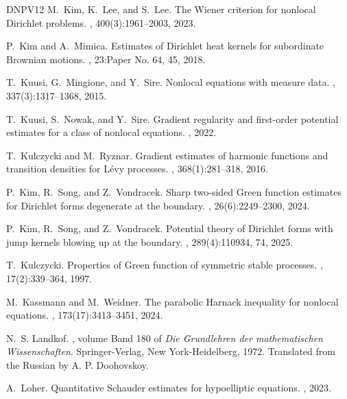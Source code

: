 \documentclass[11pt,reqno]{amsart}
\theoremstyle{plain}
\theoremstyle{definition}
\numberwithin{equation}{section}
\newcommand{\1}{\mathbbm{1}}
\begin{document}
\begin{thebibliography}{DNPV12}
M.~Kim, K.~Lee, and S.~Lee.
\newblock The {W}iener criterion for nonlocal {D}irichlet problems.
, 400(3):1961--2003, 2023.

P.~Kim and A.~Mimica.
\newblock Estimates of {D}irichlet heat kernels for subordinate {B}rownian
  motions.
, 23:Paper No. 64, 45, 2018.

T.~Kuusi, G.~Mingione, and Y.~Sire.
\newblock Nonlocal equations with measure data.
, 337(3):1317--1368, 2015.

T.~Kuusi, S.~Nowak, and Y.~Sire.
\newblock Gradient regularity and first-order potential estimates for a class
  of nonlocal equations.
, 2022.

T.~Kulczycki and M.~Ryznar.
\newblock Gradient estimates of harmonic functions and transition densities for
  {L}\'evy processes.
, 368(1):281--318, 2016.

P.~Kim, R.~Song, and Z.~Vondracek.
\newblock Sharp two-sided {G}reen function estimates for {D}irichlet forms
  degenerate at the boundary.
, 26(6):2249--2300, 2024.

P.~Kim, R.~Song, and Z.~Vondracek.
\newblock Potential theory of {D}irichlet forms with jump kernels blowing up at
  the boundary.
, 289(4):110934, 74, 2025.

T.~Kulczycki.
\newblock Properties of {G}reen function of symmetric stable processes.
, 17(2):339--364, 1997.

M.~Kassmann and M.~Weidner.
\newblock The parabolic {H}arnack inequality for nonlocal equations.
, 173(17):3413--3451, 2024.

N.~S. Landkof.
, volume Band 180 of {\em
  Die Grundlehren der mathematischen Wissenschaften}.
\newblock Springer-Verlag, New York-Heidelberg, 1972.
\newblock Translated from the Russian by A. P. Doohovskoy.

A.~Loher.
\newblock Quantitative {S}chauder estimates for hypoelliptic equations.
, 2023.


\end{thebibliography}
\end{document}
